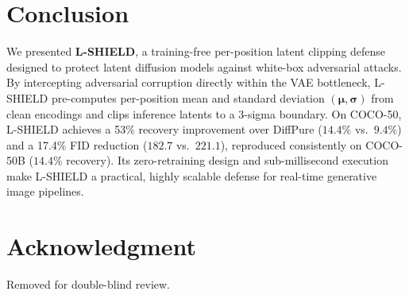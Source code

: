 \documentclass[conference]{IEEEtran}
\begin{document}
\section{Conclusion}

We presented \textbf{L-SHIELD}, a training-free per-position latent clipping defense designed to protect latent diffusion models against white-box adversarial attacks. By intercepting adversarial corruption directly within the VAE bottleneck, L-SHIELD pre-computes per-position mean and standard deviation $(\boldsymbol{\mu}, \boldsymbol{\sigma})$ from clean encodings and clips inference latents to a 3-sigma boundary. On COCO-50, L-SHIELD achieves a 53\% recovery improvement over DiffPure ($14.4\%$ vs.\ $9.4\%$) and a 17.4\% FID reduction ($182.7$ vs.\ $221.1$), reproduced consistently on COCO-50B ($14.4\%$ recovery). Its zero-retraining design and sub-millisecond execution make L-SHIELD a practical, highly scalable defense for real-time generative image pipelines.

\section*{Acknowledgment}
Removed for double-blind review.

\enlargethispage{30pt}

\small
\setlength{\itemsep}{1.0pt}
\vspace{-2pt}

\end{document}
